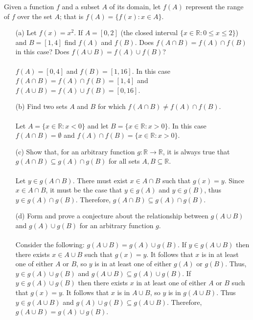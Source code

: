 \documentclass[11pt]{article}
\def\R{{\mathbb{R}}}
\newenvironment{exer}[1]
    {\renewcommand\theinnercustomexer{#1}\innercustomexer\upshape}
    {\endinnercustomexer}
\begin{document}
\begin{exer}{1.2.7}
    Given a function $f$ and a subset $A$ of its domain, let $f(A)$ represent the range of $f$ over the set $A$; that is $f(A)=\{f(x):x\in A\}$.
    \begin{enumerate}
        \item[(a)]
            Let $f(x)=x^2$. If $A=[0,2]$ (the closed interval $\{x\in\R:0\leq x\leq 2\}$) and $B=[1,4]$ find $f(A)$ and $f(B)$. Does $f(A\cap B)=f(A)\cap f(B)$ in this case? Does $f(A\cup B)=f(A)\cup f(B)$? \\ \\
            $f(A)=[0, 4]$ and $f(B)=[1, 16]$. In this case $f(A\cap B)=f(A)\cap f(B)=[1, 4]$ and $f(A\cup B)=f(A)\cup f(B)=[0, 16]$.
        \item[(b)]
            Find two sets $A$ and $B$ for which $f(A\cap B)\neq f(A)\cap f(B)$. \\ \\
            Let $A=\{x\in\R:x<0\}$ and let $B=\{x\in\R:x>0\}$. In this case $f(A\cap B)=\emptyset$ and $f(A)\cap f(B)=\{x\in\R:x>0\}$.
        \item[(c)]
            Show that, for an arbitrary function $g:\R\to\R$, it is always true that $g(A\cap B)\subseteq g(A)\cap g(B)$ for all sets $A,B\subseteq\R$. \\ \\
            Let $y\in g(A\cap B)$. There must exist $x\in A\cap B$ such that $g(x)=y$. Since $x\in A\cap B$, it must be the case that $y\in g(A)$ and $y\in g(B)$, thus $y\in g(A)\cap g(B)$. Therefore, $g(A\cap B)\subseteq g(A)\cap g(B)$.
        \item[(d)]
            Form and prove a conjecture about the relationship between $g(A\cup B)$ and $g(A)\cup g(B)$ for an arbitrary function $g$. \\ \\
            Consider the following: $g(A\cup B)=g(A)\cup g(B)$. If $y\in g(A\cup B)$ then there exists $x\in A\cup B$ such that $g(x)=y$. It follows that $x$ is in at least one of either $A$ or $B$, so $y$ is in at least one of either $g(A)$ or $g(B)$. Thus, $y\in g(A)\cup g(B)$ and $g(A\cup B)\subseteq g(A)\cup g(B)$. If $y\in g(A)\cup g(B)$ then there exists $x$ in at least one of either $A$ or $B$ such that $g(x)=y$. It follows that $x$ is in $A\cup B$, so $y$ is in $g(A\cup B)$. Thus $y\in g(A\cup B)$ and $g(A)\cup g(B)\subseteq g(A\cup B)$. Therefore, $g(A\cup B)=g(A)\cup g(B)$.
    \end{enumerate}
\end{exer}
\end{document}
